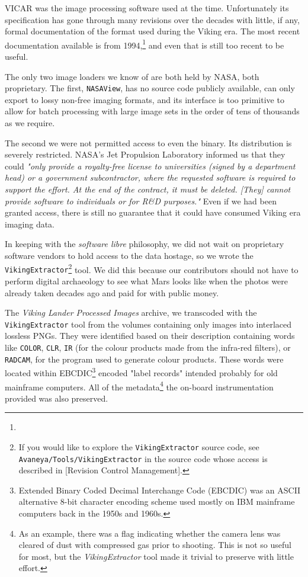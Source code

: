 VICAR was the image processing software used at the time. Unfortunately its specification has gone through many revisions over the decades with little, if any, formal documentation of the format used during the Viking era. The most recent documentation available is from 1994,\footnote{} and even that is still too recent to be useful.

The only two image loaders we know of are both held by NASA, both proprietary. The first, {\tt NASAView}, has no source code publicly available, can only export to lossy non-free imaging formats, and its interface is too primitive to allow for batch processing with large image sets in the order of tens of thousands as we require. 

The second we were not permitted access to even the binary. Its distribution is severely restricted. NASA's Jet Propulsion Laboratory informed us that they could {\it "only provide a royalty-free license to universities (signed by a department head) or a government subcontractor, where the requested software is required to support the effort. At the end of the contract, it must be deleted. [They] cannot provide software to individuals or for R&D purposes."} Even if we had been granted access, there is still no guarantee that it could have consumed Viking era imaging data.

In keeping with the {\it software libre} philosophy, we did not wait on proprietary software vendors to hold access to the data hostage, so we wrote the {\tt VikingExtractor}\footnote{If you would like to explore the {\tt VikingExtractor} source code, see {\tt Avaneya/Tools/VikingExtractor} in the source code whose access is described in [Revision Control Management].} tool. We did this because our contributors should not have to perform digital archaeology to see what Mars looks like when the photos were already taken decades ago and paid for with public money.

The {\it Viking Lander Processed Images} archive, we transcoded with the {\tt VikingExtractor} tool from the volumes containing only images into interlaced lossless PNGs. They were identified based on their description containing words like {\tt COLOR}, {\tt CLR}, {\tt IR} (for the colour products made from the infra-red filters), or {\tt RADCAM}, for the program used to generate colour products. These words were located within EBCDIC\footnote{Extended Binary Coded Decimal Interchange Code (EBCDIC) was an ASCII alternative 8-bit character encoding scheme used mostly on IBM mainframe computers back in the 1950s and 1960s.} encoded "label records" intended probably for old mainframe computers. All of the metadata\footnote{As an example, there was a flag indicating whether the camera lens was cleared of dust with compressed gas prior to shooting. This is not so useful for most, but the {\it VikingExtractor} tool made it trivial to preserve with little effort.} the on-board instrumentation provided was also preserved.


